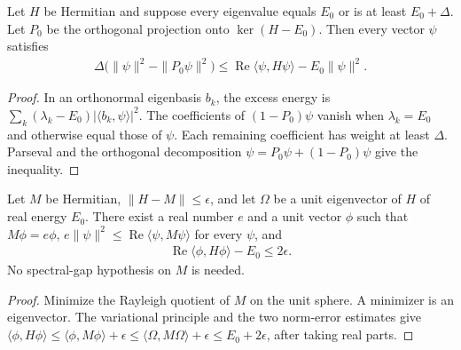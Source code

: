 \begin{lemma}
    \label{thm:hastings05_ground_space_quadratic_gap}
    \leanok
    Let $H$ be Hermitian and suppose every eigenvalue equals $E_0$ or is
    at least $E_0+\Delta$. Let $P_0$ be the orthogonal projection onto
    $\ker(H-E_0)$. Then every vector $\psi$ satisfies
    \begin{align}
        \Delta\bigl(\|\psi\|^2-\|P_0\psi\|^2\bigr)
        \le \operatorname{Re}\langle\psi,H\psi\rangle-E_0\|\psi\|^2.
        \label{eq:hastings05_ground_space_quadratic_gap}
    \end{align}
\end{lemma}
\begin{proof}\leanok
    In an orthonormal eigenbasis $b_k$, the excess energy is
    $\sum_k(\lambda_k-E_0)|\langle b_k,\psi\rangle|^2$.
    The coefficients of $(1-P_0)\psi$ vanish when $\lambda_k=E_0$ and
    otherwise equal those of $\psi$. Each remaining coefficient has
    weight at least $\Delta$. Parseval and the orthogonal decomposition
    $\psi=P_0\psi+(1-P_0)\psi$ give the inequality.
\end{proof}

\begin{lemma}
    \label{thm:hastings05_approximate_ground_vector_energy}
    \leanok
    Let $M$ be Hermitian, $\|H-M\|\le\epsilon$, and let $\Omega$ be a unit
    eigenvector of $H$ of real energy $E_0$. There exist a real number $e$
    and a unit vector $\phi$ such that $M\phi=e\phi$,
    $e\|\psi\|^2\le\operatorname{Re}\langle\psi,M\psi\rangle$ for every
    $\psi$, and
    \begin{align}
        \operatorname{Re}\langle\phi,H\phi\rangle-E_0\le2\epsilon.
        \label{eq:hastings05_approximate_ground_vector_energy}
    \end{align}
    No spectral-gap hypothesis on $M$ is needed.
\end{lemma}
\begin{proof}\leanok
    Minimize the Rayleigh quotient of $M$ on the unit sphere. A minimizer
    is an eigenvector. The variational principle and the two norm-error
    estimates give
    $\langle\phi,H\phi\rangle
        \le\langle\phi,M\phi\rangle+\epsilon
        \le\langle\Omega,M\Omega\rangle+\epsilon
        \le E_0+2\epsilon$, after taking real parts.
\end{proof}

